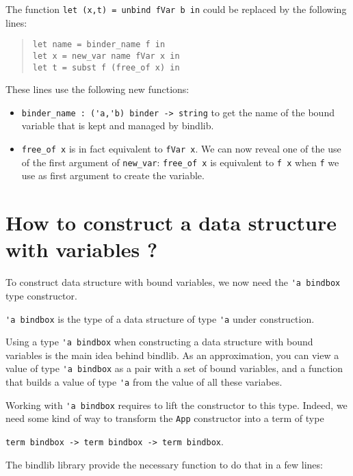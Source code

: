\documentclass[11pt]{article}
\begin{document}
The function \verb!let (x,t) = unbind fVar b in! could be replaced by the following lines:
\begin{quote}
\begin{verbatim}
let name = binder_name f in
let x = new_var name fVar x in
let t = subst f (free_of x) in
\end{verbatim}
\end{quote}


These lines use the following new functions:

\begin{itemize}
\item \verb#binder_name : ('a,'b) binder -> string# to get the name
  of the bound variable that is kept and managed by bindlib.


\item \verb#free_of x# is in fact equivalent to \verb#fVar x#.
We can now reveal one of the use of the first argument of
\verb#new_var#: \verb#free_of x# is equivalent to \verb#f x# when
\verb#f# we use as first argument to create the variable.

\end{itemize}


\section{How to construct a data structure with variables ?}

To construct data structure with bound variables, we now need the
\verb!'a bindbox!
type constructor.

\verb!'a bindbox! is the type of a data structure of type \verb#'a# under
construction.

Using a type \verb!'a bindbox! when constructing a data structure with
bound variables is the main idea behind bindlib. As an approximation,
you can view a value of type \verb!'a bindbox! as a pair with a set
of bound variables, and a function that builds a value of type \verb!'a!
from the value of all these variabes.

Working with \verb!'a bindbox! requires to lift the constructor to
this type. Indeed, we need some kind of way to transform the
\verb!App! constructor into a term of type
\begin{center}
  \verb!term bindbox -> term bindbox -> term bindbox!.
\end{center}
The bindlib library
provide the necessary function to do that in a few lines:
\end{document}
